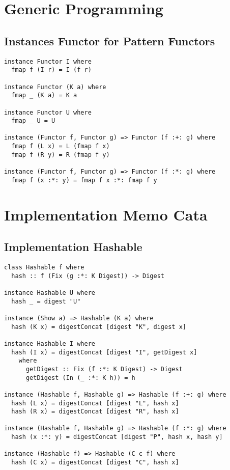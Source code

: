 \appendix
\chapter{Generic Programming}
\section{Instances Functor for Pattern Functors}
\label{app-inst-functor-patfun}
\begin{verbatim}
instance Functor I where
  fmap f (I r) = I (f r)

instance Functor (K a) where
  fmap _ (K a) = K a

instance Functor U where
  fmap _ U = U

instance (Functor f, Functor g) => Functor (f :+: g) where
  fmap f (L x) = L (fmap f x)
  fmap f (R y) = R (fmap f y)

instance (Functor f, Functor g) => Functor (f :*: g) where
  fmap f (x :*: y) = fmap f x :*: fmap f y
\end{verbatim}


\chapter{Implementation Memo Cata}
\section{Implementation Hashable}
\label{app-impl-hashable}
\begin{verbatim}
class Hashable f where
  hash :: f (Fix (g :*: K Digest)) -> Digest

instance Hashable U where
  hash _ = digest "U"

instance (Show a) => Hashable (K a) where
  hash (K x) = digestConcat [digest "K", digest x]

instance Hashable I where
  hash (I x) = digestConcat [digest "I", getDigest x]
    where
      getDigest :: Fix (f :*: K Digest) -> Digest
      getDigest (In (_ :*: K h)) = h

instance (Hashable f, Hashable g) => Hashable (f :+: g) where
  hash (L x) = digestConcat [digest "L", hash x]
  hash (R x) = digestConcat [digest "R", hash x]

instance (Hashable f, Hashable g) => Hashable (f :*: g) where
  hash (x :*: y) = digestConcat [digest "P", hash x, hash y]

instance (Hashable f) => Hashable (C c f) where
  hash (C x) = digestConcat [digest "C", hash x]
\end{verbatim}

